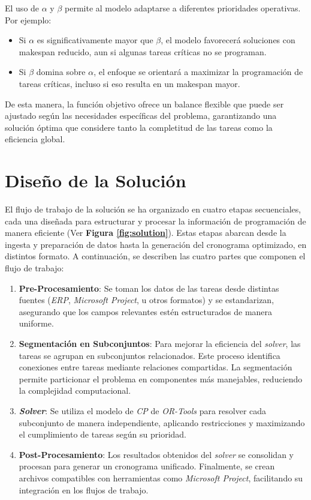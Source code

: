 \documentclass{article}
\begin{document}
El uso de \( \alpha \) y \( \beta \) permite al modelo adaptarse a diferentes prioridades operativas. Por ejemplo:

\begin{itemize}
    \item Si \( \alpha \) es significativamente mayor que \( \beta \), el modelo favorecerá soluciones con makespan reducido, aun si algunas tareas críticas no se programan.
    \item Si \( \beta \) domina sobre \( \alpha \), el enfoque se orientará a maximizar la programación de tareas críticas, incluso si eso resulta en un makespan mayor.
\end{itemize}

De esta manera, la función objetivo ofrece un balance flexible que puede ser ajustado según las necesidades específicas del problema, garantizando una solución óptima que considere tanto la completitud de las tareas como la eficiencia global.



\section{Diseño de la Solución}

El flujo de trabajo de la solución se ha organizado en cuatro etapas secuenciales, cada una diseñada para estructurar y procesar la información de programación de manera eficiente (Ver \textbf{Figura \ref{fig:solution}}). Estas etapas abarcan desde la ingesta y preparación de datos hasta la generación del cronograma optimizado, en distintos formato. A continuación, se describen las cuatro partes que componen el flujo de trabajo:

\begin{enumerate}
    \item \textbf{Pre-Procesamiento}: Se toman los datos de las tareas desde distintas fuentes (\textit{ERP}, \textit{Microsoft Project}, u otros formatos) y se estandarizan, asegurando que los campos relevantes estén estructurados de manera uniforme.

    \item \textbf{Segmentación en Subconjuntos}: Para mejorar la eficiencia del \textit{solver}, las tareas se agrupan en subconjuntos relacionados. Este proceso identifica conexiones entre tareas mediante relaciones compartidas. La segmentación permite particionar el problema en componentes más manejables, reduciendo la complejidad computacional.

    \item \textbf{\textit{Solver}}: Se utiliza el modelo de \textit{CP} de \textit{OR-Tools} para resolver cada subconjunto de manera independiente, aplicando restricciones y maximizando el cumplimiento de tareas según su prioridad.

    \item \textbf{Post-Procesamiento}: Los resultados obtenidos del \textit{solver} se consolidan y procesan para generar un cronograma unificado. Finalmente, se crean archivos compatibles con herramientas como \textit{Microsoft Project}, facilitando su integración en los flujos de trabajo.
\end{enumerate}
\end{document}
